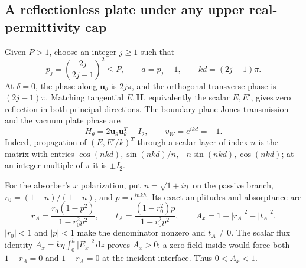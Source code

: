 \documentclass[11pt]{article}
\newcommand{\dd}{\,\mathrm{d}}
\newcommand{\uvec}{\mathbf u_\theta}
\newcommand{\abs}[1]{\lvert #1\rvert}
\begin{document}
\subsection{A reflectionless plate under any upper real-permittivity cap}
Given $P>1$, choose an integer $j\geq1$ such that
\begin{equation}\label{eq:plate-design}
 p_j=\left(\frac{2j}{2j-1}\right)^2\leq P,\qquad
 a=p_j-1,\qquad kd=(2j-1)\pi.
\end{equation}
At $\delta=0$, the phase along $\uvec$ is $2j\pi$, and the orthogonal transverse phase is $(2j-1)\pi$. Matching tangential $E,\mathbf H$, equivalently the scalar $E,E'$, gives zero reflection in both principal directions. The boundary-plane Jones transmission and the vacuum plate phase are
\begin{equation}\label{eq:jones}
 H_\theta=2\uvec\uvec^T-I_2,\qquad v_W=e^{ikd}=-1.
\end{equation}
Indeed, propagation of $(E,E'/k)^T$ through a scalar layer of index $n$ is the matrix with entries $\cos(nkd),\sin(nkd)/n,-n\sin(nkd),\cos(nkd)$; at an integer multiple of $\pi$ it is $\pm I_2$.

For the absorber's $x$ polarization, put $n=\sqrt{1+i\eta}$ on the passive branch, $r_0=(1-n)/(1+n)$, and $p=e^{inkh}$. Its exact amplitudes and absorptance are
\begin{equation}\label{eq:absorber}
 r_A=\frac{r_0(1-p^2)}{1-r_0^2p^2},\qquad
 t_A=\frac{(1-r_0^2)p}{1-r_0^2p^2},\qquad
 A_x=1-\abs{r_A}^2-\abs{t_A}^2.
\end{equation}
$\abs{r_0}<1$ and $\abs p<1$ make the denominator nonzero and $t_A\ne0$. The scalar flux identity $A_x=k\eta\int_0^h\abs{E_x}^2\dd z$ proves $A_x>0$: a zero field inside would force both $1+r_A=0$ and $1-r_A=0$ at the incident interface. Thus $0<A_x<1$.
\end{document}
